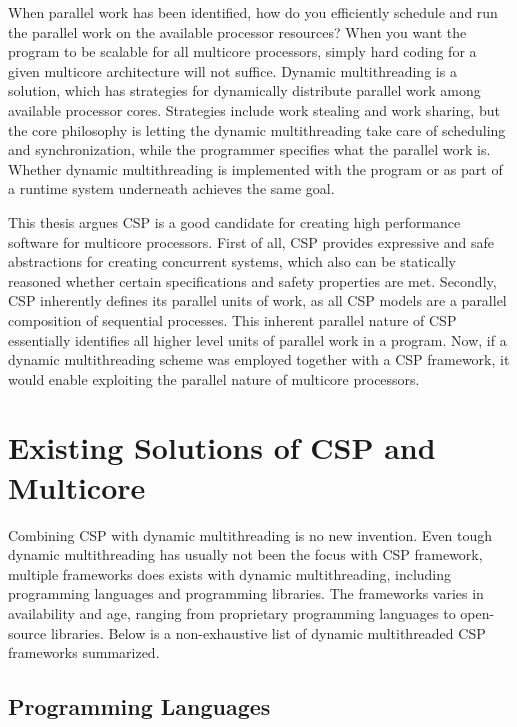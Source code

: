 When parallel work has been identified, how do you efficiently schedule and run the parallel work on the available processor resources? When you want the program to be scalable for all multicore processors, simply hard coding for a given multicore architecture will not suffice. Dynamic multithreading is a solution, which has strategies for dynamically distribute parallel work among available processor cores. Strategies include work stealing and work sharing, but the core philosophy is letting the dynamic multithreading take care of scheduling and synchronization, while the programmer specifies what the parallel work is. Whether dynamic multithreading is implemented with the program or as part of a runtime system underneath achieves the same goal. 

This thesis argues CSP is a good candidate for creating high performance software for multicore processors. First of all, CSP provides expressive and safe abstractions for creating concurrent systems, which also can be statically reasoned whether certain specifications and safety properties are met. Secondly, CSP inherently defines its parallel units of work, as all CSP models are a parallel composition of sequential processes. This inherent parallel nature of CSP essentially identifies all higher level units of parallel work in a program. Now, if a dynamic multithreading scheme was employed together with a CSP framework, it would enable exploiting the parallel nature of multicore processors.


\section{Existing Solutions of CSP and Multicore}
\label{sec:multicore_csp_existing}


Combining CSP with dynamic multithreading is no new invention. Even tough dynamic multithreading has usually not been the focus with CSP framework, multiple frameworks does exists with dynamic multithreading, including programming languages and programming libraries. The frameworks varies in availability and age, ranging from proprietary programming languages to open\hyp{}source libraries. Below is a non\hyp{}exhaustive list of dynamic multithreaded CSP frameworks summarized.


\subsection{Programming Languages}


